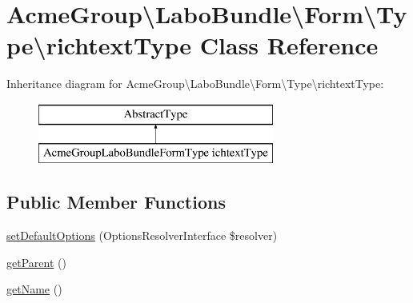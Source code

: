 \hypertarget{class_acme_group_1_1_labo_bundle_1_1_form_1_1_type_1_1richtext_type}{\section{Acme\+Group\textbackslash{}Labo\+Bundle\textbackslash{}Form\textbackslash{}Type\textbackslash{}richtext\+Type Class Reference}
\label{class_acme_group_1_1_labo_bundle_1_1_form_1_1_type_1_1richtext_type}
}
Inheritance diagram for Acme\+Group\textbackslash{}Labo\+Bundle\textbackslash{}Form\textbackslash{}Type\textbackslash{}richtext\+Type\+:\begin{figure}[H]
\begin{center}
\leavevmode
\includegraphics[height=2.000000cm]{class_acme_group_1_1_labo_bundle_1_1_form_1_1_type_1_1richtext_type}
\end{center}
\end{figure}
\subsection*{Public Member Functions}
\begin{DoxyCompactItemize}
\item 
\hyperlink{class_acme_group_1_1_labo_bundle_1_1_form_1_1_type_1_1richtext_type_a9043ee51aa7d8b19371f7778da6855a3}{set\+Default\+Options} (Options\+Resolver\+Interface \$resolver)
\item 
\hyperlink{class_acme_group_1_1_labo_bundle_1_1_form_1_1_type_1_1richtext_type_a721772de86d0946095625791088eb4ac}{get\+Parent} ()
\item 
\hyperlink{class_acme_group_1_1_labo_bundle_1_1_form_1_1_type_1_1richtext_type_a407d3de58f17680dce893200a4b10899}{get\+Name} ()
\end{DoxyCompactItemize}


